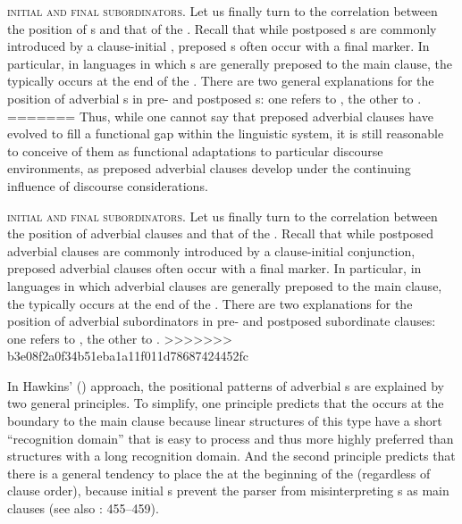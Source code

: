 \documentclass[output=paper]{langsci/langscibook}
\begin{document}
\textsc{initial} \textsc{and} \textsc{final} \textsc{subordinators}. Let us finally turn to the correlation between the position of s and that of the . Recall that while postposed s are commonly introduced by a clause-initial , preposed s often occur with a final marker. In particular, in languages in which s are generally preposed to the main clause, the  typically occurs at the end of the . There are two general explanations for the position of adverbial s in pre- and postposed s: one refers to , the other to .
=======
Thus, while one cannot say that preposed adverbial clauses have evolved to fill a functional gap within the linguistic system, it is still reasonable to conceive of them as functional adaptations to particular discourse environments, as preposed adverbial clauses develop under the continuing influence of discourse considerations.

\textsc{initial} \textsc{and} \textsc{final} \textsc{subordinators}. Let us finally turn to the correlation between the position of adverbial clauses and that of the . Recall that while postposed adverbial clauses are commonly introduced by a clause-initial conjunction, preposed adverbial clauses often occur with a final marker. In particular, in languages in which adverbial clauses are generally preposed to the main clause, the  typically occurs at the end of the . There are two  explanations for the position of adverbial subordinators in pre- and postposed subordinate clauses: one refers to , the other to .
>>>>>>> b3e08f2a0f34b51eba1a11f011d78687424452fc


In Hawkins’ (\citeyear{Hawkins1994,Hawkins2004})  approach, the positional patterns of adverbial s are explained by two general principles. To simplify, one principle predicts that the  occurs at the boundary to the main clause because linear structures of this type have a short “recognition domain” that is easy to process and thus more highly preferred than structures with a long recognition domain. And the second principle predicts that there is a general tendency to place the  at the beginning of the  (regardless of clause order), because initial s prevent the parser from misinterpreting s as main clauses (see also \citealt{Diessel2005}: 455--459).
\end{document}

